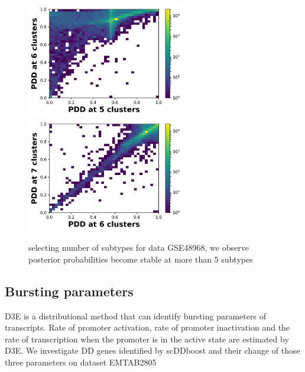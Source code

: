 \documentclass[11pt]{amsart}
\begin{document}
\begin{figure}[H]
  \includegraphics[height = 5cm, width=\linewidth]{Figs/G48_56.png}
\endminipage\hfill
{}
  \includegraphics[height = 5cm, width=\linewidth]{Figs/G48_67.png}
\endminipage\hfill
\caption{selecting number of subtypes for data GSE48968, we observe posterior probabilities become stable at more than 5 subtypes}
\end{figure}

\subsection{Bursting parameters}
D3E\cite{ref:d3e} is a distributional method that can identify bursting parameters of transcripts. Rate of promoter activation, rate of promoter inactivation and the rate of transcription when the promoter is in the active state are estimated by D3E.  We investigate DD genes identified by scDDboost and their change of those three parameters on dataset EMTAB2805\\
\end{document}
